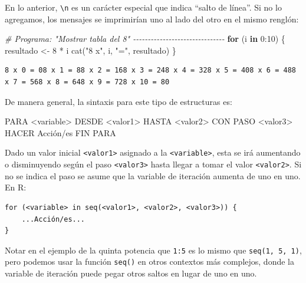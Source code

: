 \documentclass[
]{book}
\newenvironment{Shaded}{\begin{snugshade}}{\end{snugshade}}
\newcommand{\CommentTok}[1]{\textcolor[rgb]{0.56,0.35,0.01}{\textit{#1}}}
\newcommand{\ControlFlowTok}[1]{\textcolor[rgb]{0.13,0.29,0.53}{\textbf{#1}}}
\newcommand{\DecValTok}[1]{\textcolor[rgb]{0.00,0.00,0.81}{#1}}
\newcommand{\FunctionTok}[1]{\textcolor[rgb]{0.00,0.00,0.00}{#1}}
\newcommand{\NormalTok}[1]{#1}
\newcommand{\OtherTok}[1]{\textcolor[rgb]{0.56,0.35,0.01}{#1}}
\newcommand{\SpecialCharTok}[1]{\textcolor[rgb]{0.00,0.00,0.00}{#1}}
\newcommand{\StringTok}[1]{\textcolor[rgb]{0.31,0.60,0.02}{#1}}
\begin{document}
En lo anterior, \texttt{\textbackslash{}n} es un carácter especial que indica ``salto de línea''. Si no lo agregamos, los mensajes se imprimirían uno al lado del otro en el mismo renglón:

\begin{Shaded}
\begin{Highlighting}[]
\CommentTok{\# Programa: "Mostrar tabla del 8" {-}{-}{-}{-}{-}{-}{-}{-}{-}{-}{-}{-}{-}{-}{-}{-}{-}{-}{-}{-}{-}{-}{-}{-}{-}{-}{-}{-}{-}{-}{-}}
\ControlFlowTok{for}\NormalTok{ (i }\ControlFlowTok{in} \DecValTok{0}\SpecialCharTok{:}\DecValTok{10}\NormalTok{) \{}
\NormalTok{    resultado }\OtherTok{\textless{}{-}} \DecValTok{8} \SpecialCharTok{*}\NormalTok{ i}
    \FunctionTok{cat}\NormalTok{(}\StringTok{"8 x"}\NormalTok{, i, }\StringTok{"="}\NormalTok{, resultado)}
\NormalTok{\}}
\end{Highlighting}
\end{Shaded}

\begin{verbatim}
8 x 0 = 08 x 1 = 88 x 2 = 168 x 3 = 248 x 4 = 328 x 5 = 408 x 6 = 488 x 7 = 568 x 8 = 648 x 9 = 728 x 10 = 80
\end{verbatim}

De manera general, la sintaxis para este tipo de estructuras es:

\begin{Shaded}
\begin{Highlighting}[]
\NormalTok{PARA \textless{}variable\textgreater{} DESDE \textless{}valor1\textgreater{} HASTA \textless{}valor2\textgreater{} CON PASO \textless{}valor3\textgreater{} HACER}
\NormalTok{    Acción/es}
\NormalTok{FIN PARA}
\end{Highlighting}
\end{Shaded}

Dado un valor inicial \texttt{\textless{}valor1\textgreater{}} asignado a la \texttt{\textless{}variable\textgreater{}}, esta se irá aumentando o disminuyendo según el paso \texttt{\textless{}valor3\textgreater{}} hasta llegar a tomar el valor \texttt{\textless{}valor2\textgreater{}}. Si no se indica el paso se asume que la variable de iteración aumenta de uno en uno. En R:

\begin{verbatim}
for (<variable> in seq(<valor1>, <valor2>, <valor3>)) {
    ...Acción/es...
}
\end{verbatim}

Notar en el ejemplo de la quinta potencia que \texttt{1:5} es lo mismo que \texttt{seq(1,\ 5,\ 1)}, pero podemos usar la función \texttt{seq()} en otros contextos más complejos, donde la variable de iteración puede pegar otros saltos en lugar de uno en uno.
\end{document}
